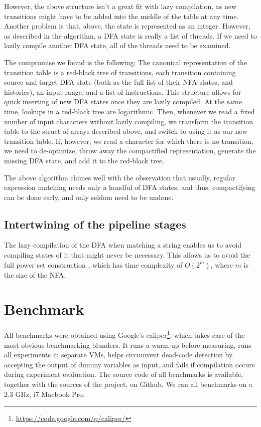\documentclass[english]{sigplanconf}
\theoremstyle{definition}
\begin{document}
However, the above structure isn't a great fit with lazy compilation,
as new transitions might have to be added into the middle of the
table at any time.  Another problem is that, above, the state is
represented as an integer.  However, as described in the algorithm,
a DFA state is really a list of threads. If we need to lazily compile
another DFA state, all of the threads need to be examined.

The compromise we found is the following: The canonical representation
of the transition table is a red-black tree of transitions, each
transition containing source and target DFA state (both as the full
list of their NFA states, and histories), an input range, and a
list of instructions. This structure allows for quick inserting of
new DFA states once they are lazily compiled.  At the same time,
lookups in a red-black tree are logarithmic.  Then, whenever we
read a fixed number of input characters without lazily compiling,
we transform the transition table to the struct of arrays described
above, and switch to using it as our new transition table.
If, however, we read a character for which there is no transition, we need to
de-optimize, throw away the compactified representation, 
generate the missing DFA state, and add it to the red-black tree.

The above algorithm chimes well with the observation that usually,
regular expression matching needs only a handful of DFA states, and thus,
compactifying can be done early, and only seldom need to be undone.

\subsection{Intertwining of the pipeline stages}
The lazy compilation of the DFA when matching a string enables us
to avoid compiling states of it that might never be necessary. This
allows us to avoid the full power set construction \cite{Sips05a}, which has 
time complexity of $O(2^m)$, where $m$ is the size of the NFA.

\section{Benchmark}
All benchmarks were obtained using Google's
caliper\footnote{\url{https://code.google.com/p/caliper/}}, which
takes care of the most obvious benchmarking blunders.  It runs a
warm-up before measuring, runs all experiments in separate VMs,
helps circumvent dead-code detection by accepting the output of
dummy variables as input, and fails if compilation occurs during
experiment evaluation.  The source code of all benchmarks is
available, together with the sources of the project, on Github. We
ran all benchmarks on a 2.3 GHz, i7 Macbook Pro.
\end{document}
